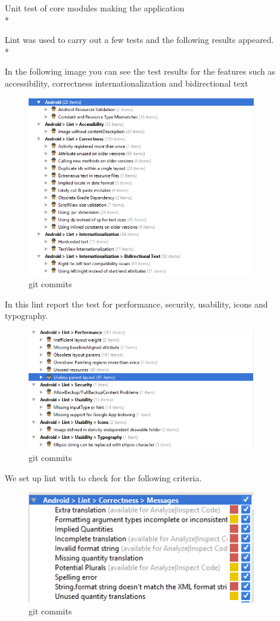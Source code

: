 Unit test of core modules making the application\\*

Lint was used to carry out a few tests and the following results appeared.\\*

In the following image you can see the test results for the features such as accessibility, correctness internationalization and bidirectional text

\begin{figure}[H]
  		\centering
      	\includegraphics[width=100mm]{Capture1}	      	
  		\caption{git commits}
\end{figure}

In this lint report the test for performance, security, usability, icons and typography.

\begin{figure}[H]
  		\centering
      	\includegraphics[width=100mm]{Capture2}	      	
  		\caption{git commits}
\end{figure}

We set up lint with to check for the following criteria. 

\begin{figure}[H]
  		\centering
      	\includegraphics[width=100mm]{Capture4}	      	
  		\caption{git commits}
\end{figure}

